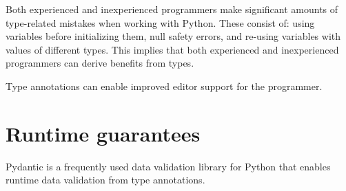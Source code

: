 Both experienced and inexperienced programmers make significant amounts of type-related mistakes when working with Python\cite{khan_empirical_2022}. These consist of: using variables before initializing them, null safety errors, and re-using variables with values of different types. This implies that both experienced and inexperienced programmers can derive benefits from types.

Type annotations can enable improved editor support for the programmer.


\section{Runtime guarantees}

Pydantic is a frequently used data validation library for Python that enables runtime data validation from type annotations\cite{pydanticdev_welcome_nodate}.
